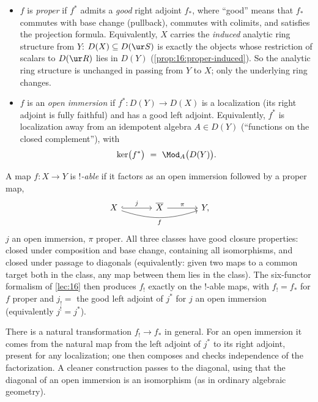 \begin{definition}
\label{def:18:proper-open}
\leavevmode
\begin{itemize}
\item $f$ is \emph{proper} if $f^*$ admits a \emph{good} right adjoint
$f_*$, where ``good'' means that $f_*$ commutes with base change (pullback),
commutes with colimits, and satisfies the projection formula. Equivalently, $X$
carries the \emph{induced} analytic ring structure from $Y$: $D(X)\subseteq D(\ur S)$ is
exactly the objects whose restriction of scalars to $D(\ur R)$ lies in $D(Y)$
(\cref{prop:16:proper-induced}). So the analytic ring structure is unchanged in
passing from $Y$ to $X$; only the underlying ring changes.
\item $f$ is an \emph{open immersion} if $f^*\colon D(Y)\to D(X)$ is a
localization (its right adjoint is fully faithful) and has a good left adjoint.
Equivalently, $f^*$ is localization away from an idempotent algebra $A\in D(Y)$
(``functions on the closed complement''), with
\begin{equation*}
\ker\bigl(f^*\bigr)\ =\ \Mod_A\bigl(D(Y)\bigr).
\end{equation*}
\end{itemize}
\end{definition}

\begin{definition}
\label{def:18:shriekable}
A map $f\colon X\to Y$ is \emph{$!$-able} if it factors as an open immersion
followed by a proper map,
\begin{equation*}
\begin{tikzcd}[column sep=large]
X \arrow[r, "j", hook] \arrow[rr, bend right=18, "f"'] & \overline X \arrow[r, "\pi"] & Y,
\end{tikzcd}
\end{equation*}
$j$ an open immersion, $\pi$ proper. All three classes have good closure
properties: closed under composition and base change, containing all
isomorphisms, and closed under passage to diagonals (equivalently: given two
maps to a common target both in the class, any map between them lies in the
class). The six-functor formalism of \cref{lec:16} then produces $f_!$ exactly on
the $!$-able maps, with $f_!=f_*$ for $f$ proper and $j_!=$ the good left adjoint
of $j^*$ for $j$ an open immersion (equivalently $j^!=j^*$).
\end{definition}

\begin{remark}
\label{rmk:18:shriek-to-star}
There is a natural transformation $f_!\to f_*$ in general. For an open immersion it
comes from the natural map from the left adjoint of $j^*$ to its right adjoint,
present for any localization; one then composes and checks independence of the
factorization. A cleaner construction passes to the diagonal, using that the
diagonal of an open immersion is an isomorphism (as in ordinary algebraic
geometry).
\end{remark}

